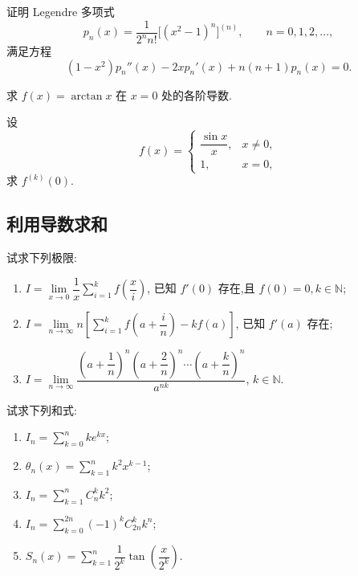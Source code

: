 \documentclass[../数学分析培优讲义.tex]{subfiles}
\begin{document}
\begin{example}
证明 Legendre 多项式
\[
    p_n(x)=\dfrac{1}{2^n n!}\bigl[(x^2-1)^n\bigr]^{(n)},
    \qquad n=0,1,2,\ldots,
\]
满足方程
\[
    (1-x^2)p_n''(x)-2xp_n'(x)+n(n+1)p_n(x)=0.
\]
\end{example}
\exampleblank


\newpage


\begin{example}
求 $f(x)=\arctan x$ 在 $x=0$ 处的各阶导数.
\end{example}
\exampleblank

\begin{example}
设
\[
f(x)=
\begin{cases}
    \dfrac{\sin x}{x}, & x\neq0,\\
    1, & x=0,
\end{cases}
\]
求 $f^{(k)}(0)$.
\end{example}
\exampleblank


\newpage

\subsection{利用导数求和}

\begin{example}
试求下列极限:
\begin{enumerate}[label=(\arabic*)]
    \item $\displaystyle
    I=\lim\limits_{x\to0}\dfrac{1}{x}\sum\limits_{i=1}^k f\left(\dfrac{x}{i}\right)$,
    已知 $f'(0)$ 存在,且 $f(0)=0,k\in\mathbb{N}$;
    \item $\displaystyle
    I=\lim\limits_{n\to\infty}n\left[\sum\limits_{i=1}^k f\left(a+\dfrac{i}{n}\right)-kf(a)\right]$,
    已知 $f'(a)$ 存在;
    \item $\displaystyle
    I=\lim\limits_{n\to\infty}
    \dfrac{\left(a+\dfrac{1}{n}\right)^n\left(a+\dfrac{2}{n}\right)^n\cdots\left(a+\dfrac{k}{n}\right)^n}{a^{nk}}$,
    $k\in\mathbb{N}$.
\end{enumerate}
\end{example}
\exampleblank

\begin{example}
试求下列和式:
\begin{enumerate}[label=(\arabic*)]
    \item $\displaystyle I_n=\sum\limits_{k=0}^n ke^{kx}$;
    \item $\displaystyle \theta_n(x)=\sum\limits_{k=1}^n k^2x^{k-1}$;
    \item $\displaystyle I_n=\sum\limits_{k=1}^n C_{n}^{k}k^2$;
    \item $\displaystyle I_n=\sum\limits_{k=0}^{2n}(-1)^k C_{2n}^{k}k^n$;
    \item $\displaystyle S_n(x)=\sum\limits_{k=1}^n\dfrac{1}{2^k}\tan\left(\dfrac{x}{2^k}\right)$.
\end{enumerate}
\end{example}
\exampleblank
\end{document}
